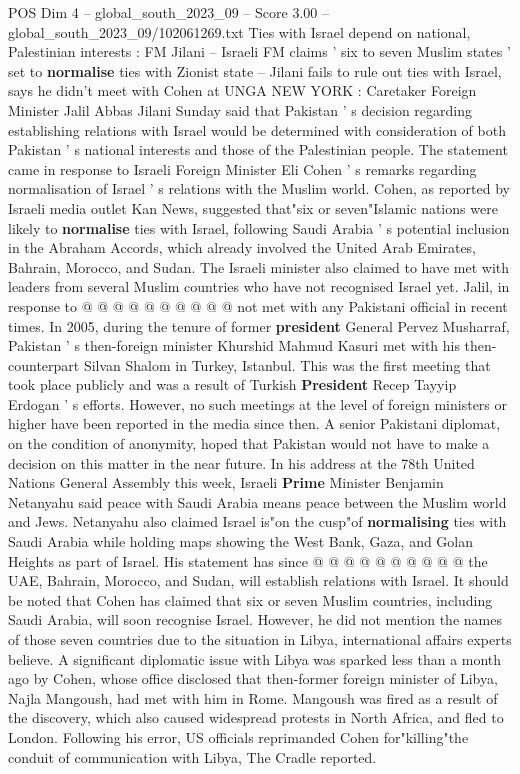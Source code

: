 \begin{textsample}{POS Dim 4 – global\_south\_2023\_09 – Score 3.00 – global\_south\_2023\_09/102061269.txt}  \label{ex:f4_pos_425}
Ties with Israel depend on national, Palestinian interests : FM Jilani -- Israeli FM claims ' six to seven Muslim states ' set to \textbf{normalise} ties with Zionist state -- Jilani fails to rule out ties with Israel, says he didn't meet with Cohen at UNGA NEW YORK : Caretaker Foreign Minister Jalil Abbas Jilani Sunday said that Pakistan ' s decision regarding establishing relations with Israel would be determined with consideration of both Pakistan ' s national interests and those of the Palestinian people.
The statement came in response to Israeli Foreign Minister Eli Cohen ' s remarks regarding normalisation of Israel ' s relations with the Muslim world.
Cohen, as reported by Israeli media outlet Kan News, suggested that"six or seven"Islamic nations were likely to \textbf{normalise} ties with Israel, following Saudi Arabia ' s potential inclusion in the Abraham Accords, which already involved the United Arab Emirates, Bahrain, Morocco, and Sudan.
The Israeli minister also claimed to have met with leaders from several Muslim countries who have not recognised Israel yet.
Jalil, in response to @ @ @ @ @ @ @ @ @ @ not met with any Pakistani official in recent times.
In 2005, during the tenure of former \textbf{president} General Pervez Musharraf, Pakistan ' s then-foreign minister Khurshid Mahmud Kasuri met with his then-counterpart Silvan Shalom in Turkey, Istanbul.
This was the first meeting that took place publicly and was a result of Turkish \textbf{President} Recep Tayyip Erdogan ' s efforts.
However, no such meetings at the level of foreign ministers or higher have been reported in the media since then.
A senior Pakistani diplomat, on the condition of anonymity, hoped that Pakistan would not have to make a decision on this matter in the near future.
In his address at the 78th United Nations General Assembly this week, Israeli \textbf{Prime} Minister Benjamin Netanyahu said peace with Saudi Arabia means peace between the Muslim world and Jews.
Netanyahu also claimed Israel is"on the cusp"of \textbf{normalising} ties with Saudi Arabia while holding maps showing the West Bank, Gaza, and Golan Heights as part of Israel.
His statement has since @ @ @ @ @ @ @ @ @ @ the UAE, Bahrain, Morocco, and Sudan, will establish relations with Israel.
It should be noted that Cohen has claimed that six or seven Muslim countries, including Saudi Arabia, will soon recognise Israel.
However, he did not mention the names of those seven countries due to the situation in Libya, international affairs experts believe.
A significant diplomatic issue with Libya was sparked less than a month ago by Cohen, whose office disclosed that then-former foreign minister of Libya, Najla Mangoush, had met with him in Rome.
Mangoush was fired as a result of the discovery, which also caused widespread protests in North Africa, and fled to London.
Following his error, US officials reprimanded Cohen for"killing"the conduit of communication with Libya, The Cradle reported.

\end{textsample}
